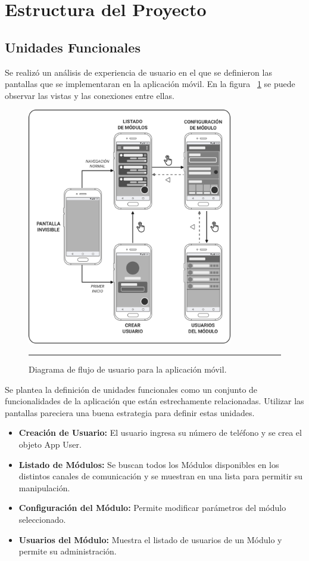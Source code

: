 \section{Estructura del Proyecto}
\subsection{Unidades Funcionales}
Se realizó un análisis de experiencia de usuario en el que se definieron las pantallas que se implementaran en la aplicación móvil. En la figura ~\ref{fig:app_flow} se puede observar las vistas y las conexiones entre ellas.

\begin{figure}[htbp]
	\centering
	\includegraphics[width=0.8\textwidth]{Figures/design/user_flow_ink.png}
	\rule{35em}{1pt}
	\caption[Diagrama de Navegación (Wireframes)]{Diagrama de flujo de usuario para la aplicación móvil.}
	\label{fig:app_flow}
\end{figure}

Se plantea la definición de unidades funcionales como un conjunto de funcionalidades de la aplicación que están estrechamente relacionadas.
Utilizar las pantallas pareciera una buena estrategia para definir estas unidades. 

\begin{itemize}
	\item \textbf{Creación de Usuario:} El usuario ingresa su número de teléfono y se crea el objeto App User.
	\item \textbf{Listado de Módulos:} Se buscan todos los Módulos disponibles en los distintos canales de comunicación y se muestran en una lista para permitir su manipulación.
	\item \textbf{Configuración del Módulo:} Permite modificar parámetros del módulo seleccionado.
	\item \textbf{Usuarios del Módulo:} Muestra el listado de usuarios de un Módulo y permite su administración.
\end{itemize}

